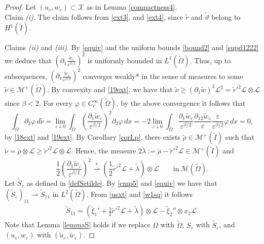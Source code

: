 \documentclass[a4, 11pt, reqno, final]{amsart}
\newcommand{\calL}{\mathcal{L}}
\newcommand{\calM}{\mathcal{M}}
\newcommand{\calX}{\mathcal{X}}
\newcommand\e{\varepsilon}
\newcommand\weakstar{\stackrel{\ast }{\rightharpoonup}}  %
\newcommand\weak{\rightharpoonup} %
\theoremstyle{plain}%
\begin{document}
	\begin{proof}
		Let $(u_\e, w_{\e})\subset \calX$ as in Lemma \ref{compactness4}.\\
		Claim \textit{(i)}.	The claim follows from \eqref{ext3}, and \eqref{ext4}, since $\widetilde{r}$ and $\widetilde{\vartheta}$ belong to $H^1(\widetilde{I})$.

		Claims \textit{(ii)} and \textit{(iii)}. By \eqref{equiv} and the uniform bounds \eqref{bound2} and \eqref{supd1222} we deduce that $(\partial_1 \frac{\widetilde{w}_\e}{\e^{\beta/2}})^2$ is uniformly bounded in $L^1(\widetilde{\Omega})$. Thus, up to subsequences, $(\partial_1\frac{\widetilde{w}_\e}{\e^{\beta/2}})^2 $ converges weakly* in the sense of measures to some $\widetilde{\nu} \in \calM^+(\widetilde{\Omega})$. By convexity and \eqref{19ext}, we have that $\widetilde{\nu} \geq (\partial_1 \widetilde{w})^2\calL^2 = \widetilde{r}'^2 \calL \otimes \calL$ since $\beta < 2$.
		For every $\varphi \in C_c^\infty(\widetilde{\Omega})$, by the above convergence it follows that
		$$ \int_{\widetilde{\Omega}} \partial_2\varphi \, d\widetilde{\nu} = \lim_{\e\downarrow 0}\int_{\widetilde{\Omega}} (\frac{\partial_1 \widetilde{w}_\e}{\e^{\beta/2}})^2 \partial_2\varphi \, dx = -2 \lim_{\e\downarrow 0} \int_{\widetilde{\Omega}} \frac{\partial_1 \widetilde{w}_\e}{\e^{\beta/2}}\frac{\partial_{12} \widetilde{w}_\e}\e \frac\e{\e^{\beta/2}} \varphi \, dx = 0, $$
		by \eqref{18ext} and \eqref{19ext}. By Corollary \ref{corLp}, there exists $\widetilde{\rho} \in \calM^+(\widetilde{I})$ such that $\widetilde{\nu} = \widetilde{\rho} \otimes \calL \geq \widetilde{r}'^2\calL \otimes \calL$. Hence, the measure $2\widetilde{\lambda}:=\widetilde{\rho} - \widetilde{r}'^2 \calL \in \calM^+(\widetilde{I})$ and
		\begin{equation}\label{w1sq}
			\frac12(\frac{\partial_1 \widetilde{w}_\e}{\e^{\beta/2}})^2 \weakstar (\frac12\widetilde{r}'^2 \calL + \widetilde{\lambda})\otimes \calL \qquad \text{in} \ \calM(\widetilde{\Omega}).
		\end{equation}
		Let $\widetilde{S}_\e$ as defined in \eqref{defSetilde}. By \eqref{cmp5} and \eqref{equiv} we have that $(\widetilde{S}_\e)_{11} \weak \widetilde{S}_{11}$ in $L^2(\widetilde{\Omega})$.
		From \eqref{uext} and \eqref{w1sq} it follows
		$$
		\begin{aligned}
			\widetilde{S}_{11}=(\widetilde{\xi}_1'+ \frac12 \widetilde{r}'^2\calL+\widetilde{\lambda})\otimes \calL  - \widetilde{\xi}_2''\otimes x_2 \calL.
		\end{aligned}
		$$
		Note that Lemma \ref{lemmaS} holds if we replace $\Omega$ with $\widetilde{\Omega}$, $S_\e$ with $\widetilde{S}_\e$, and $(u_\e, w_\e)$ with $(\widetilde{u}_\e, \widetilde{w}_\e)$.

\end{proof}
\end{document}
